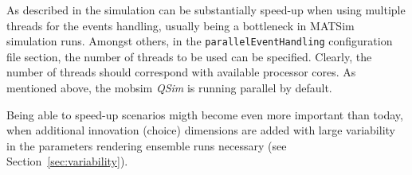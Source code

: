As described in \citet[][]{WaraichEtAl_TechRep_IVT_2009, WaraichEtAl_STRC_2009} the simulation can be substantially speed-up when using multiple threads for the events handling, usually being a bottleneck in MATSim simulation runs. Amongst others, in the \lstinline|parallelEventHandling| configuration file section, the number of threads to be used can be specified. Clearly, the number of threads should correspond with available processor cores. As mentioned above, the mobsim \emph{QSim} is running parallel by default.

Being able to speed-up scenarios migth become even more important than today, when additional innovation (choice) dimensions are added with large variability in the parameters rendering ensemble runs necessary (see Section~\ref{sec:variability}).



%
%
%
%


